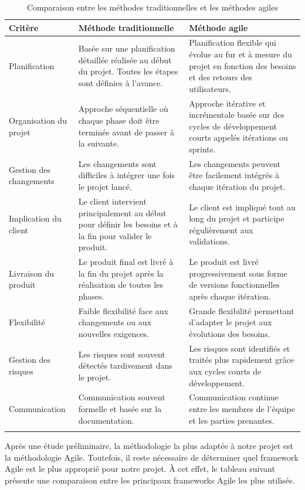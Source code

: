 \begin{center}
\begin{longtable}{|p{2.5cm}|p{6cm}|p{6cm}|}

\hline
\textbf{Critère} & \textbf{Méthode traditionnelle} & \textbf{Méthode agile} \\
\hline
\endhead

Planification &
Basée sur une planification détaillée réalisée au début du projet. Toutes les étapes sont définies à l’avance. &
Planification flexible qui évolue au fur et à mesure du projet en fonction des besoins et des retours des utilisateurs. \\
\hline

Organisation du projet &
Approche séquentielle où chaque phase doit être terminée avant de passer à la suivante. &
Approche itérative et incrémentale basée sur des cycles de développement courts appelés itérations ou sprints. \\
\hline

Gestion des changements &
Les changements sont difficiles à intégrer une fois le projet lancé. &
Les changements peuvent être facilement intégrés à chaque itération du projet. \\
\hline

Implication du client &
Le client intervient principalement au début pour définir les besoins et à la fin pour valider le produit. &
Le client est impliqué tout au long du projet et participe régulièrement aux validations. \\
\hline

Livraison du produit &
Le produit final est livré à la fin du projet après la réalisation de toutes les phases. &
Le produit est livré progressivement sous forme de versions fonctionnelles après chaque itération. \\
\hline

Flexibilité &
Faible flexibilité face aux changements ou aux nouvelles exigences. &
Grande flexibilité permettant d’adapter le projet aux évolutions des besoins. \\
\hline

Gestion des risques &
Les risques sont souvent détectés tardivement dans le projet. &
Les risques sont identifiés et traités plus rapidement grâce aux cycles courts de développement. \\
\hline

Communication &
Communication souvent formelle et basée sur la documentation. &
Communication continue entre les membres de l’équipe et les parties prenantes. \\
\hline
\caption{Comparaison entre les méthodes traditionnelles et les méthodes agiles}
\end{longtable}
\end{center}
Après une étude préliminaire, la méthodologie la plus adaptée à notre projet est la méthodologie Agile. Toutefois, il reste nécessaire de déterminer quel framework Agile est le plus approprié pour notre projet. À cet effet, le tableau suivant présente une comparaison entre les principaux frameworks Agile les plus utilisés.

